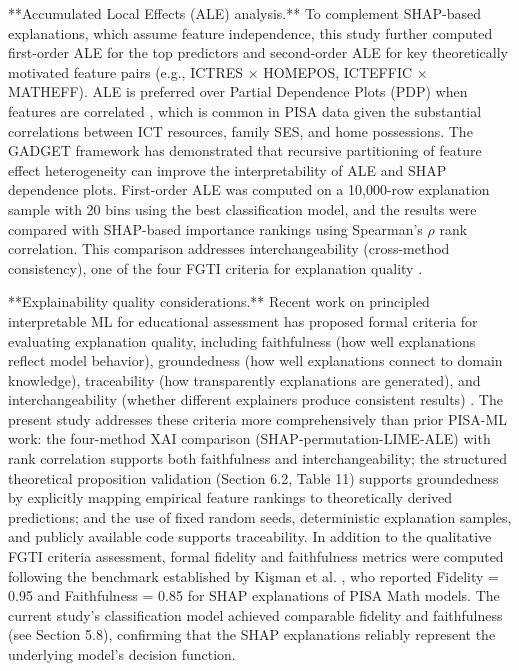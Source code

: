 \documentclass[pdflatex,sn-mathphys-ay]{sn-jnl}
\begin{document}
**Accumulated Local Effects (ALE) analysis.** To complement SHAP-based explanations, which assume feature independence, this study further computed first-order ALE for the top predictors and second-order ALE for key theoretically motivated feature pairs (e.g., ICTRES × HOMEPOS, ICTEFFIC × MATHEFF). ALE is preferred over Partial Dependence Plots (PDP) when features are correlated \citep{Molnar_2022}, which is common in PISA data given the substantial correlations between ICT resources, family SES, and home possessions. The GADGET framework \citep{Herbinger_2024_GADGET} has demonstrated that recursive partitioning of feature effect heterogeneity can improve the interpretability of ALE and SHAP dependence plots. First-order ALE was computed on a 10,000-row explanation sample with 20 bins using the best classification model, and the results were compared with SHAP-based importance rankings using Spearman's $\rho$ rank correlation. This comparison addresses interchangeability (cross-method consistency), one of the four FGTI criteria for explanation quality \citep{Kim_2025_FGTI}.

**Explainability quality considerations.** Recent work on principled interpretable ML for educational assessment has proposed formal criteria for evaluating explanation quality, including faithfulness (how well explanations reflect model behavior), groundedness (how well explanations connect to domain knowledge), traceability (how transparently explanations are generated), and interchangeability (whether different explainers produce consistent results) \citep{Kim_2025_FGTI}. The present study addresses these criteria more comprehensively than prior PISA-ML work: the four-method XAI comparison (SHAP-permutation-LIME-ALE) with rank correlation supports both faithfulness and interchangeability; the structured theoretical proposition validation (Section 6.2, Table 11) supports groundedness by explicitly mapping empirical feature rankings to theoretically derived predictions; and the use of fixed random seeds, deterministic explanation samples, and publicly available code supports traceability. In addition to the qualitative FGTI criteria assessment, formal fidelity and faithfulness metrics were computed following the benchmark established by Kişman et al. \citep{Kisman_2026}, who reported Fidelity = 0.95 and Faithfulness = 0.85 for SHAP explanations of PISA Math models. The current study's classification model achieved comparable fidelity and faithfulness (see Section 5.8), confirming that the SHAP explanations reliably represent the underlying model's decision function.
\end{document}
